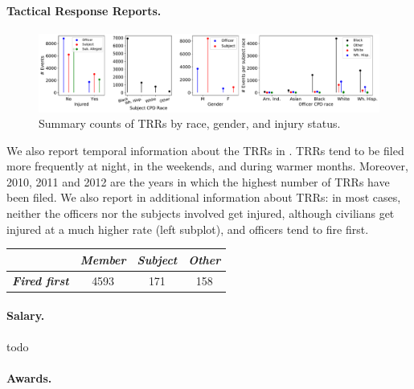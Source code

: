 \paragraph{Tactical Response Reports.}

\begin{figure}[t!] 
	\includegraphics[width=\textwidth]{figs/trr_stats} 
	\caption{Summary counts of TRRs by race, gender, and injury status.} \label{fig:trrs_stats1}
\end{figure}

We also report temporal information about the TRRs in . TRRs tend to be filed more frequently at night, in the weekends, and during warmer months. Moreover, 2010, 2011 and 2012 are the years in which the highest number of TRRs have been filed. We also report in  additional information about TRRs: in most cases, neither the officers nor the subjects involved get injured, although civilians get injured at a much higher rate (left subplot), and officers tend to fire first. 
\begin{tabular}{c|c|c|c|}
\cline{2-4}
                                                    & \textit{Member} & \textit{Subject} & \textit{Other} \\ \hline
\multicolumn{1}{|c|}{\textit{\textbf{Fired first}}} & 4593            & 171               & 158            \\ \hline
\end{tabular}


\paragraph{Salary.} todo

\paragraph{Awards.}


